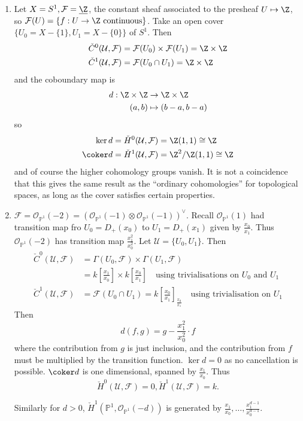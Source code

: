 \documentclass[a4paper]{article}
\renewcommand*{\P}{\mathbb{P}}
\newcommand{\sh}[1]{\mathcal{#1}} %
\begin{document}
\begin{eg}\leavevmode
  \begin{enumerate}
  \item Let \(X = S^1, \sh F = \underline \Z\), the constant sheaf associated to the presheaf \(U \mapsto \Z\), so \(\sh F(U) = \{f: U \to \Z \text{ continuous}\}\). Take an open cover \(\{U_0 = X - \{1\}, U_1 = X - \{0\}\}\) of \(S^1\). Then
    \begin{align*}
      \check C^0(\mathcal U, \sh F) &= \sh F(U_0) \times \sh F(U_1) = \Z \times \Z \\
      \check C^1(\mathcal U, \sh F) &= \sh F(U_0 \cap U_1) = \Z \times \Z
    \end{align*}
    and the coboundary map is
    \begin{align*}
      d: \Z \times \Z &\to \Z \times \Z \\
      (a, b) &\mapsto (b - a, b - a)
    \end{align*}
    so
    \begin{align*}
      \ker d &= \check H^0(\mathcal U, \sh F) = \Z(1, 1) \cong \Z \\
      \coker d &= \check H^1(\mathcal U, \sh F) = \Z^2/\Z(1, 1) \cong \Z
    \end{align*}
    and of course the higher cohomology groups vanish. It is not a coincidence that this gives the same result as the ``ordinary cohomologies'' for topological spaces, as long as the cover satisfies certain properties.
  \item \(\sh F = \sh O_{\P^1}(-2) = (\sh O_{\P^1}(-1) \otimes \sh O_{\P^1}(-1))^\vee\). Recall \(\sh O_{\P^1}(1)\) had transition map fro \(U_0 = D_+(x_0)\) to \(U_1 = D_+(x_1)\) given by \(\frac{x_0}{x_1}\). Thus \(\sh O_{\P^1}(-2)\) has transition map \(\frac{x_1^2}{x_0^2}\). Let \(\mathcal U = \{U_0, U_1\}\). Then
    \begin{align*}
      \check C^0(\mathcal U, \sh F) &= \Gamma(U_0, \sh F) \times \Gamma(U_1, \sh F) \\
                                               &= k[\frac{x_1}{x_0}] \times k[\frac{x_0}{x_1}] \quad \text{using trivialisations on \(U_0\) and \(U_1\)} \\
      \check C^1(\mathcal U, \sh F) &= \sh F(U_0 \cap U_1) = k[\frac{x_0}{x_1}]_{\frac{x_0}{x_1}} \quad \text{using trivialisation on \(U_1\)}
    \end{align*}
    Then
    \[
      d(f, g) = g - \frac{x_1^2}{x_0^2} \cdot f
    \]
    where the contribution from \(g\) is just inclusion, and the contribution from \(f\) must be multiplied by the transition function. \(\ker d = 0\) as no cancellation is possible. \(\coker d\) is one dimensional, spanned by  \(\frac{x_1}{x_0}\). Thus
    \[
      \check H^0(\mathcal U, \sh F) = 0, \check H^1(\mathcal U, \sh F) = k.
    \]

    Similarly for \(d > 0\), \(\check H^1(\P^1, \sh O_{\P^1}(-d))\) is generated by \(\frac{x_1}{x_0}, \dots, \frac{x_1^{d - 1}}{x_0^{d - 1}}\).
  \end{enumerate}
\end{eg}
\end{document}
